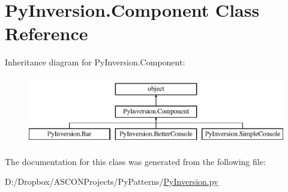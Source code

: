 \hypertarget{class_py_inversion_1_1_component}{\section{Py\+Inversion.\+Component Class Reference}
\label{class_py_inversion_1_1_component}
}
Inheritance diagram for Py\+Inversion.\+Component\+:\begin{figure}[H]
\begin{center}
\leavevmode
\includegraphics[height=3.000000cm]{class_py_inversion_1_1_component}
\end{center}
\end{figure}


The documentation for this class was generated from the following file\+:\begin{DoxyCompactItemize}
\item 
D\+:/\+Dropbox/\+A\+S\+C\+O\+N\+Projects/\+Py\+Patterns/\hyperlink{_py_inversion_8py}{Py\+Inversion.\+py}\end{DoxyCompactItemize}
